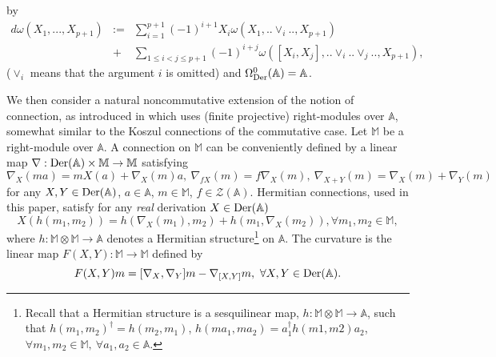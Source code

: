 \documentclass[a4paper,11pt]{article}
\numberwithin{equation}{section}
\newcommand\caZ{{\mathcal Z}}
\newcommand\algebA{{\mathbb A}}
\newcommand\modul{{\mathbb M}}
\newcommand\DER{{\text{\textup{Der}}}}
\newcommand\kS{{\mathfrak S}}
\theoremstyle{nonumberplain}
\begin{document}
by
%
\begin{eqnarray*}
d\omega(X_1,..., X_{p+1})& :=& \sum_{i=1}^{p+1} (-1)^{i+1} X_i \omega( X_1,..\vee_i.., X_{p+1}) \\
&+&  \sum_{1\leq i < j \leq p+1} (-1)^{i+j} \omega( [X_i, X_j],..\vee_i..\vee_j.., X_{p+1}) \label{eq:koszul},
\end{eqnarray*}
($\vee_i$ means that the argument $i$ is omitted) and ${\Omega}^0_{\DER}(\algebA)=\algebA$. \par 

We then consider a natural noncommutative extension of the notion of connection, as introduced in \cite{dbv1} which uses (finite projective) right-modules over $\algebA$, somewhat similar to the Koszul connections of the commutative case. Let $\modul$ be a right-module over $\algebA$. A connection on $\modul$ can be conveniently defined %
by a linear map ${\nabla} :  \DER(\algebA)\times  \modul \rightarrow \modul$ satisfying
\begin{equation}
{\nabla}_X (m a) = mX( a) + {\nabla}_X (m) a,\ {\nabla}_{fX}( m) = f{\nabla}_X (m),\ 
{\nabla}_{X + Y} (m) = {\nabla}_X (m) + {\nabla}_Y (m) \label{connect}
\end{equation}
for any $X,Y \in \DER(\algebA)$, $a \in \algebA$, $m \in \modul$, $f \in \caZ(\algebA)$.  Hermitian connections, used in this paper, satisfy  for any {\it{real}} derivation $X \in \DER(\algebA)$
\begin{equation}
 X(h(m_1,m_2))=h(\nabla_X(m_1),m_2)+h(m_1,\nabla_X(m_2)), \forall m_1,m_2\in\modul,\label{hermitconnect}
\end{equation}
where $h:\modul\otimes\modul\to\algebA$ denotes a Hermitian structure{\footnote{Recall that a Hermitian structure is a sesquilinear map, $h:\modul\otimes\modul\to\algebA$, such that $h(m_1,m_2)^\dag=h(m_2,m_1)$, $h(ma_1,ma_2)=a_1^\dag h(m1,m2)a_2$, $\forall m_1,m_2\in\modul,\ \forall a_1,a_2\in\algebA$.}} on $\algebA$. The curvature is the linear map $F(X, Y) : \modul \rightarrow \modul$ defined by
\begin{equation}
 F(X, Y) m = [ {\nabla}_X,{\nabla}_Y ] m - {\nabla}_{[X, Y]}m,\ \forall X, Y \in \DER(\algebA)\label{courgene}.
\end{equation}
\end{document}
